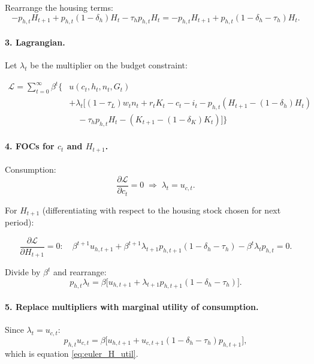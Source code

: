 Rearrange the housing terms:
\[
- p_{h,t}H_{t+1} + p_{h,t}(1-\delta_h)H_t - \tau_h p_{h,t} H_t
= - p_{h,t}H_{t+1} + p_{h,t}(1-\delta_h-\tau_h)H_t.
\]

\paragraph{3. Lagrangian.}
Let $\lambda_t$ be the multiplier on the budget constraint:

\begin{align}
\mathcal{L} = \sum_{t=0}^{\infty}\beta^t \Big\{ &
u(c_t,h_t,n_t,G_t) \nonumber \\
&+ \lambda_t \big[ (1-\tau_L)w_t n_t + r_t K_t
- c_t - i_t
- p_{h,t}(H_{t+1}-(1-\delta_h)H_t) \nonumber \\
&\quad - \tau_h p_{h,t}H_t
- (K_{t+1}-(1-\delta_K)K_t) \big] \Big\}
\end{align}

\paragraph{4. FOCs for $c_t$ and $H_{t+1}$.}
Consumption:
\[
\frac{\partial \mathcal{L}}{\partial c_t}=0
\;\Rightarrow\;
\lambda_t = u_{c,t}.
\]

For $H_{t+1}$ (differentiating with respect to the housing stock chosen for next period):

\[
\frac{\partial \mathcal{L}}{\partial H_{t+1}}=0:
\quad
\beta^{t+1} u_{h,t+1}
+\beta^{t+1} \lambda_{t+1} p_{h,t+1}(1-\delta_h-\tau_h)
-\beta^{t}\lambda_{t} p_{h,t}=0.
\]

Divide by $\beta^{t}$ and rearrange:
\[
p_{h,t}\lambda_{t}
=
\beta\big[u_{h,t+1} + \lambda_{t+1} p_{h,t+1}(1-\delta_h-\tau_h)\big].
\]


\paragraph{5. Replace multipliers with marginal utility of consumption.}
Since $\lambda_t=u_{c,t}$:
\[
p_{h,t}u_{c,t}
=
\beta\Big[u_{h,t+1} + u_{c,t+1}(1-\delta_h-\tau_h)p_{h,t+1}\Big],
\]
which is equation \eqref{eq:euler_H_util}.

